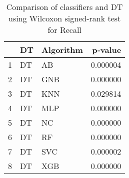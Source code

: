 \begin{table}
\footnotesize
\caption{Comparison of classifiers and DT using Wilcoxon signed-rank test for Recall}
\label{tab:DT wilcoxon Recall comparison}
\begin{tabular}{lllr}
\hline
 & DT & Algorithm & p-value \\
\hline
1 & DT & AB & 0.000004 \\
2 & DT & GNB & 0.000000 \\
3 & DT & KNN & 0.029814 \\
4 & DT & MLP & 0.000000 \\
5 & DT & NC & 0.000000 \\
6 & DT & RF & 0.000000 \\
7 & DT & SVC & 0.000002 \\
8 & DT & XGB & 0.000000 \\
\hline
\end{tabular}
\end{table}
